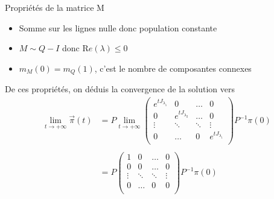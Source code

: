 \documentclass{beamer}
\theoremstyle{plain}
\theoremstyle{definition}
\theoremstyle{remark}
\begin{document}
\begin{frame}{Propriétés de la matrice M}
    \begin{itemize}
        \item Somme sur les lignes nulle donc population constante
        \item $M\sim Q-I$ donc $\mathrm{R}e(\lambda)\leqslant0$
        \item $m_M(0)=m_Q(1)$, c'est le nombre de composantes connexes 
    \end{itemize}
    De ces propriétés, on déduis la convergence de la solution vers 
    \begin{align*}
\lim\limits_{t \rightarrow +\infty}\vec{\pi}(t)&=P\lim\limits_{t \rightarrow +\infty}\begin{pmatrix}
e^{tJ_{\lambda_1}}&0&\hdots&0\\
0&e^{tJ_{\lambda_2}}&\hdots&0\\
\vdots&\ddots&\ddots&\vdots\\
0&\hdots&0&e^{tJ_{\lambda_i}}\\
\end{pmatrix}P^{-1}\pi(0)\\
\\
&=P\begin{pmatrix}
1&0&\hdots&0\\
0&0&\hdots&0\\
\vdots&\ddots&\ddots&\vdots\\
0&\hdots&0&0\\
\end{pmatrix}P^{-1}\pi(0)\\
\end{align*}
\end{frame}
\end{document}
